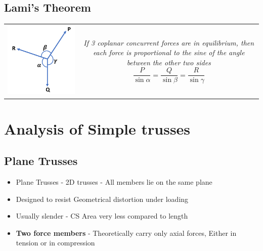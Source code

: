 \documentclass[8pt]{report}
\begin{document}
\section{Lami's Theorem}
	\begin{table}[H]
		\begin{tabular}{cc}
			\parbox{4cm}{\includegraphics[scale=0.4]{lamistheorem}} &
			\parbox{12cm}{\textit{If 3 coplanar concurrent forces are in equilibrium, then each force is proportional to the sine of the angle between the other two sides}\\$$\boxed{\dfrac{P}{\sin\alpha}=\dfrac{Q}{\sin\beta}=\dfrac{R}{\sin\gamma}}$$}
		\end{tabular}			
	\end{table}\hrulefill
\chapter{Analysis of Simple trusses}
\section{Plane Trusses}
	\begin{itemize}
		\item Plane Trusses - 2D trusses - All members lie on the same plane
		\item Designed to resist Geometrical distortion under loading
		\item Usually slender - CS Area very less compared to length
		\item \textbf{Two force members} - Theoretically carry only axial forces, Either in tension or in compression
	\end{itemize}\hrulefill
\end{document}
